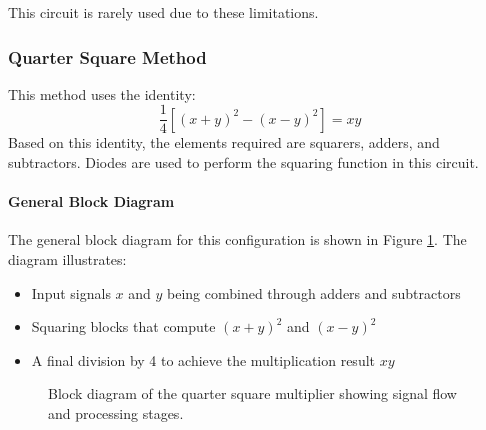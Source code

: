 \documentclass[a4paper,9pt,twoside,openany,twocolumn]{memoir}
\begin{document}
This circuit is rarely used due to these limitations.

\subsubsection{Quarter Square Method}
This method uses the identity:
\[
\frac{1}{4} \left[(x + y)^2 - (x - y)^2\right] = xy
\]
Based on this identity, the elements required are squarers, adders, and subtractors. Diodes are used to perform the squaring function in this circuit.

\paragraph{General Block Diagram}
The general block diagram for this configuration is shown in Figure \ref{fig:quarter_square_diagram}. The diagram illustrates:
\begin{itemize}
    \item Input signals \(x\) and \(y\) being combined through adders and subtractors
    \item Squaring blocks that compute \((x + y)^2\) and \((x - y)^2\)
    \item A final division by 4 to achieve the multiplication result \(xy\)
\end{itemize}

\begin{figure}[H]
\centering
{}
\caption{Block diagram of the quarter square multiplier showing signal flow and processing stages.}
\label{fig:quarter_square_diagram}
\end{figure}
\end{document}
